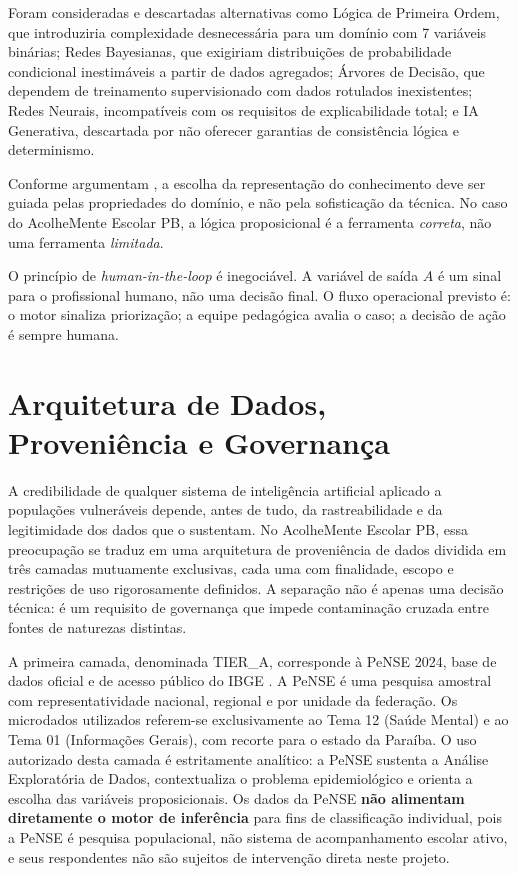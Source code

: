 \documentclass[
    12pt,
    openright,
    oneside,
    a4paper,
    english,
    brazil
]{abntex2}
\begin{document}
Foram consideradas e descartadas alternativas como L\'ogica de Primeira Ordem, que introduziria complexidade desnecess\'aria para um dom\'inio com 7 vari\'aveis bin\'arias; Redes Bayesianas, que exigiriam distribui\c{c}\~oes de probabilidade condicional inestim\'aveis a partir de dados agregados; \'Arvores de Decis\~ao, que dependem de treinamento supervisionado com dados rotulados inexistentes; Redes Neurais, incompat\'iveis com os requisitos de explicabilidade total; e IA Generativa, descartada por n\~ao oferecer garantias de consist\^encia l\'ogica e determinismo.

Conforme argumentam , a escolha da representa\c{c}\~ao do conhecimento deve ser guiada pelas propriedades do dom\'inio, e n\~ao pela sofistica\c{c}\~ao da t\'ecnica. No caso do AcolheMente Escolar PB, a l\'ogica proposicional \'e a ferramenta \textit{correta}, n\~ao uma ferramenta \textit{limitada}.

O princ\'ipio de \textit{human-in-the-loop} \'e inegoci\'avel. A vari\'avel de sa\'ida $A$ \'e um sinal para o profissional humano, n\~ao uma decis\~ao final. O fluxo operacional previsto \'e: o motor sinaliza prioriza\c{c}\~ao; a equipe pedag\'ogica avalia o caso; a decis\~ao de a\c{c}\~ao \'e sempre humana.

\chapter{Arquitetura de Dados, Proveni\^encia e Governan\c{c}a}

A credibilidade de qualquer sistema de intelig\^encia artificial aplicado a popula\c{c}\~oes vulner\'aveis depende, antes de tudo, da rastreabilidade e da legitimidade dos dados que o sustentam. No AcolheMente Escolar PB, essa preocupa\c{c}\~ao se traduz em uma arquitetura de proveni\^encia de dados dividida em tr\^es camadas mutuamente exclusivas, cada uma com finalidade, escopo e restri\c{c}\~oes de uso rigorosamente definidos. A separa\c{c}\~ao n\~ao \'e apenas uma decis\~ao t\'ecnica: \'e um requisito de governan\c{c}a que impede contamina\c{c}\~ao cruzada entre fontes de naturezas distintas.

A primeira camada, denominada TIER\_A, corresponde \`a PeNSE 2024, base de dados oficial e de acesso p\'ublico do IBGE \cite{ibge_pense_2024}. A PeNSE \'e uma pesquisa amostral com representatividade nacional, regional e por unidade da federa\c{c}\~ao. Os microdados utilizados referem-se exclusivamente ao Tema 12 (Sa\'ude Mental) e ao Tema 01 (Informa\c{c}\~oes Gerais), com recorte para o estado da Para\'iba. O uso autorizado desta camada \'e estritamente anal\'itico: a PeNSE sustenta a An\'alise Explorat\'oria de Dados, contextualiza o problema epidemiol\'ogico e orienta a escolha das vari\'aveis proposicionais. Os dados da PeNSE \textbf{n\~ao alimentam diretamente o motor de infer\^encia} para fins de classifica\c{c}\~ao individual, pois a PeNSE \'e pesquisa populacional, n\~ao sistema de acompanhamento escolar ativo, e seus respondentes n\~ao s\~ao sujeitos de interven\c{c}\~ao direta neste projeto.
\end{document}
